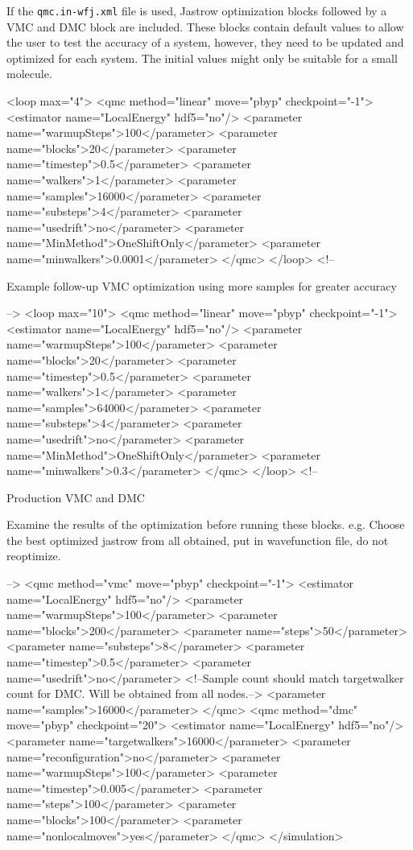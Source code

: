 \begin{itemize}
If the \texttt{qmc.in-wfj.xml} file is used, Jastrow optimization
blocks followed by a VMC and DMC block are included. These blocks
contain default values to allow the user to test the accuracy of a
system, however, they need to be updated and optimized for each
system. The initial values might only be suitable for a small molecule.

\begin{shade}
  <loop max="4">
    <qmc method="linear" move="pbyp" checkpoint="-1">
      <estimator name="LocalEnergy" hdf5="no"/>
      <parameter name="warmupSteps">100</parameter>
      <parameter name="blocks">20</parameter>
      <parameter name="timestep">0.5</parameter>
      <parameter name="walkers">1</parameter>
      <parameter name="samples">16000</parameter>
      <parameter name="substeps">4</parameter>
      <parameter name="usedrift">no</parameter>
      <parameter name="MinMethod">OneShiftOnly</parameter>
      <parameter name="minwalkers">0.0001</parameter>
    </qmc>
  </loop>
  <!--
 
Example follow-up VMC optimization using more samples for greater accuracy

-->
  <loop max="10">
    <qmc method="linear" move="pbyp" checkpoint="-1">
      <estimator name="LocalEnergy" hdf5="no"/>
      <parameter name="warmupSteps">100</parameter>
      <parameter name="blocks">20</parameter>
      <parameter name="timestep">0.5</parameter>
      <parameter name="walkers">1</parameter>
      <parameter name="samples">64000</parameter>
      <parameter name="substeps">4</parameter>
      <parameter name="usedrift">no</parameter>
      <parameter name="MinMethod">OneShiftOnly</parameter>
      <parameter name="minwalkers">0.3</parameter>
    </qmc>
  </loop>
  <!--

Production VMC and DMC

Examine the results of the optimization before running these blocks.
e.g. Choose the best optimized jastrow from all obtained, put in 
wavefunction file, do not reoptimize.

-->
  <qmc method="vmc" move="pbyp" checkpoint="-1">
    <estimator name="LocalEnergy" hdf5="no"/>
    <parameter name="warmupSteps">100</parameter>
    <parameter name="blocks">200</parameter>
    <parameter name="steps">50</parameter>
    <parameter name="substeps">8</parameter>
    <parameter name="timestep">0.5</parameter>
    <parameter name="usedrift">no</parameter>
    <!--Sample count should match targetwalker count for 
      DMC. Will be obtained from all nodes.-->
    <parameter name="samples">16000</parameter>
  </qmc>
  <qmc method="dmc" move="pbyp" checkpoint="20">
    <estimator name="LocalEnergy" hdf5="no"/>
    <parameter name="targetwalkers">16000</parameter>
    <parameter name="reconfiguration">no</parameter>
    <parameter name="warmupSteps">100</parameter>
    <parameter name="timestep">0.005</parameter>
    <parameter name="steps">100</parameter>
    <parameter name="blocks">100</parameter>
    <parameter name="nonlocalmoves">yes</parameter>
  </qmc>
</simulation>


\end{shade}
\end{itemize}
